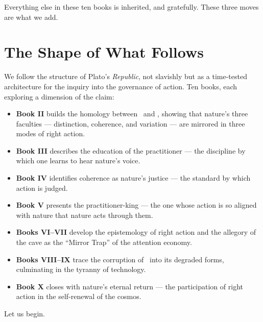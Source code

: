 Everything else in these ten books is inherited, and gratefully. These three moves
are what we add.

\section{The Shape of What Follows}

We follow the structure of Plato's \emph{Republic}, not slavishly but as a
time-tested architecture for the inquiry into the governance of action. Ten
books, each exploring a dimension of the claim:

\begin{itemize}
\item \textbf{Book II} builds the homology between \physis\ and \praxis,
  showing that nature's three faculties --- distinction, coherence, and
  variation --- are mirrored in three modes of right action.
\item \textbf{Book III} describes the education of the practitioner --- the
  discipline by which one learns to hear nature's voice.
\item \textbf{Book IV} identifies coherence as nature's justice --- the standard
  by which action is judged.
\item \textbf{Book V} presents the practitioner-king --- the one whose action is
  so aligned with nature that nature acts through them.
\item \textbf{Books VI--VII} develop the epistemology of right action and the
  allegory of the cave as the ``Mirror Trap'' of the attention economy.
\item \textbf{Books VIII--IX} trace the corruption of \praxis\ into its
  degraded forms, culminating in the tyranny of technology.
\item \textbf{Book X} closes with nature's eternal return --- the participation
  of right action in the self-renewal of the cosmos.
\end{itemize}

Let us begin.

